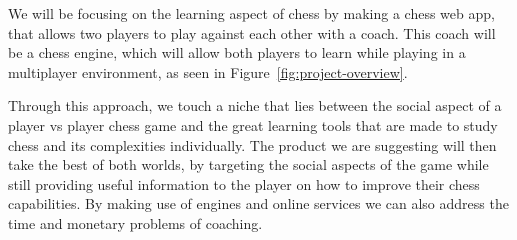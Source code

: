 We will be focusing on the learning aspect of chess by making a chess web app, that allows two players to play against
each other with a coach.
This coach will be a chess engine, which will allow both players to learn while playing in a multiplayer environment, as
seen in Figure~\ref{fig:project-overview}.

Through this approach, we touch a niche that lies between the social aspect of a player vs player chess game and the
great learning tools that are made to study chess and its complexities individually.
The product we are suggesting will then take the best of both worlds, by targeting the social aspects of the game while
still providing useful information to the player on how to improve their chess capabilities.
By making use of engines and online services we can also address the time and monetary problems of coaching.
